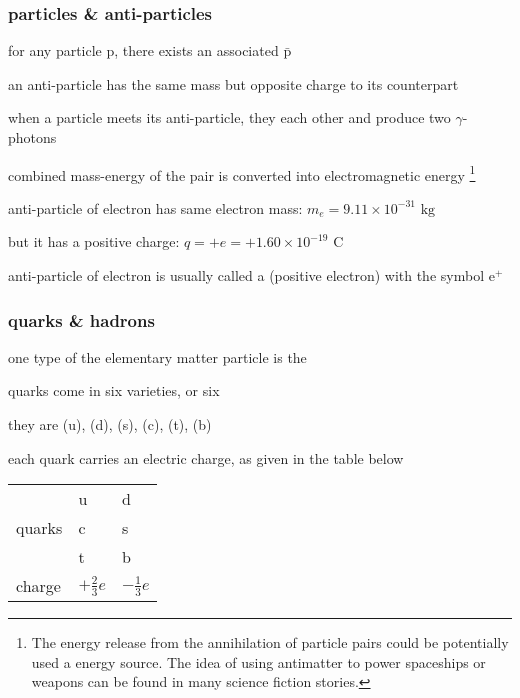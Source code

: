 \subsubsection{particles \& anti-particles}

for any particle $\text{p}$, there exists an associated  $\bar{\text{p}}$

\cmt an anti-particle has the same mass but opposite charge to its counterpart

\cmt when a particle meets its anti-particle, they  each other and produce two $\gamma$-photons

combined mass-energy of the pair is converted into electromagnetic energy
\footnote{The energy release from the annihilation of  particle pairs could be potentially used a energy source. The idea of using antimatter to power spaceships or weapons can be found in many science fiction stories.}




\sol anti-particle of electron has same electron mass: $m_e = 9.11\times10^{-31} \text{ kg}$

but it has a positive charge: $q = +e = + 1.60\times10^{-19} \text{ C}$

anti-particle of electron is usually called a  (positive electron) with the symbol $\text{e}^+$ \eoe


\subsubsection{quarks \& hadrons}

one type of the elementary matter particle is the 

\cmt quarks come in six varieties, or six 

they are  (u),  (d),  (s),  (c),  (t),  (b)

\cmt each quark carries an electric charge, as given in the table below

\begin{center}
	{\renewcommand{\arraystretch}{1.35}
		\begin{tabular}{|C{3cm}|C{2cm}|C{2cm}|}
			\hline  & u & d \\
			 quarks & c & s \\
			  & t & b \\
			\hline charge & $+\frac{2}{3}e$ & $-\frac{1}{3}e$ \\[3pt]
			\hline
		\end{tabular}
	}
\end{center}


